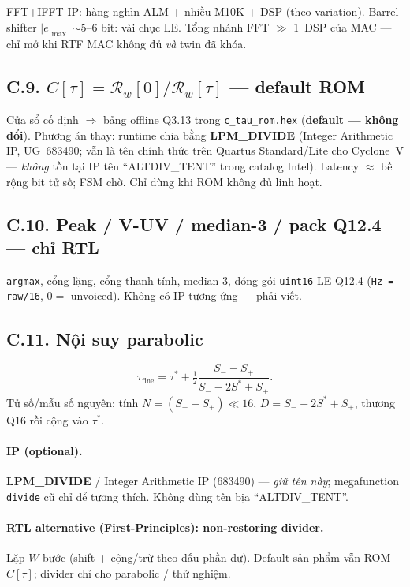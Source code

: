 \begin{costbox}
FFT+IFFT IP: hàng nghìn ALM + nhiều M10K + DSP (theo variation). Barrel shifter $|e|_{\max}$~$\sim$5--6 bit: vài chục LE. Tổng nhánh FFT $\gg$ 1~DSP của MAC --- chỉ mở khi RTF MAC không đủ \emph{và} twin đã khóa.
\end{costbox}

\subsection*{C.9. $C[\tau]=\mathcal{R}_w[0]/\mathcal{R}_w[\tau]$ --- default ROM}

Cửa sổ cố định $\Rightarrow$ bảng offline Q3.13 trong \texttt{c\_tau\_rom.hex} (\textbf{default --- không đổi}). Phương án thay: runtime chia bằng \textbf{LPM\_DIVIDE} (Integer Arithmetic IP, UG~683490; vẫn là tên chính thức trên Quartus Standard/Lite cho Cyclone~V --- \emph{không} tồn tại IP tên ``ALTDIV\_TENT'' trong catalog Intel). Latency $\approx$ bề rộng bit tử số; FSM chờ. Chỉ dùng khi ROM không đủ linh hoạt.

\subsection*{C.10. Peak / V-UV / median-3 / pack Q12.4 --- chỉ RTL}
\texttt{argmax}, cổng lặng, cổng thanh tính, median-3, đóng gói \texttt{uint16} LE Q12.4 (\texttt{Hz = raw/16}, $0=$ unvoiced). Không có IP tương ứng --- phải viết.

\subsection*{C.11. Nội suy parabolic}
\[
\tau_{\text{fine}} = \tau^* + \tfrac12\frac{S_{-}-S_{+}}{S_{-}-2S^{*}+S_{+}}.
\]
Tử số/mẫu số nguyên: tính $N=(S_{-}-S_{+})\ll 16$, $D=S_{-}-2S^{*}+S_{+}$, thương Q16 rồi cộng vào $\tau^*$.

\paragraph{IP (optional).} \textbf{LPM\_DIVIDE} / Integer Arithmetic IP (683490) --- \emph{giữ tên này}; megafunction \texttt{divide} cũ chỉ để tương thích. Không dùng tên bịa ``ALTDIV\_TENT''.

\paragraph{RTL alternative (First-Principles): non-restoring divider.} Lặp $W$ bước (shift + cộng/trừ theo dấu phần dư). Default sản phẩm vẫn ROM $C[\tau]$; divider chỉ cho parabolic / thử nghiệm.

